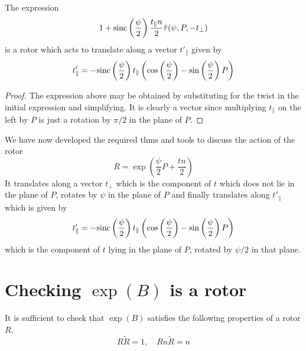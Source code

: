 \begin{lemma}
The expression
\[
 1 + \mathrm{sinc}\left(\frac{\psi}{2}\right)\frac{t_\parallel n}{2} \tilde{\tau}(\psi, P, - t_\perp)
\]
is a rotor which acts to translate along a vector $t'_\parallel$ given by
\[
t'_\parallel = - \mathrm{sinc}\left(\frac{\psi}{2}\right)
t_\parallel
\left(
\cos\left(\frac{\psi}{2}\right) -
\sin\left(\frac{\psi}{2}\right) P 
\right)
\]
\end{lemma}
\begin{proof}
The expression above may be obtained by substituting for the twist in the initial expression and simplifying. 
It is clearly a vector since multiplying $t_\parallel$ on the left by $P$ is just a rotation by $\pi / 2$ in the plane
of $P$.
\end{proof}

We have now developed the required thms and tools to discuss the
action of the rotor
\[
R = \exp\left(
\frac{\psi}{2} P + \frac{tn}{2}
\right)
\]
It translates along a vector $t_\perp$ which is the component of $t$ which does not lie in the
plane of $P$, rotates by $\psi$ in the plane of $P$ and finally translates along 
$t'_\parallel$ which is given by
\[
t'_\parallel =- \mathrm{sinc}\left(\frac{\psi}{2}\right)
t_\parallel
\left(
\cos\left(\frac{\psi}{2}\right) -
\sin\left(\frac{\psi}{2}\right) P 
\right)
\]
which is the component of $t$ lying in the
plane of $P$, rotated by $\psi/2$ in that plane.

\section{Checking $\exp(B)$ is a rotor}

It is sufficient to check that $\exp(B)$ satisfies the following
properties of a rotor $R$. %
\[
R\tilde{R} = 1, \quad Rn\tilde{R} = n
\]

